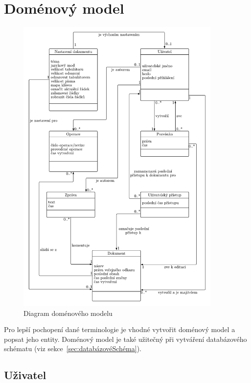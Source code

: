 \section{Doménový model}\label{sec:domenovyModel}

\begin{figure}[ht!]
    \centering
    \includegraphics[width=0.9\textwidth]{partials/analyza/domenovy_model-2.pdf}
    \caption{Diagram doménového modelu}\label{fig:domenovy_model}
\end{figure}

Pro lepší pochopení dané terminologie je vhodné vytvořit doménový model a popsat jeho entity.
Doménový model je také užitečný při vytváření databázového schématu (viz sekce~\ref{sec:databázovéSchéma}).

\subsection{Uživatel}\label{subsec:uživatel}

